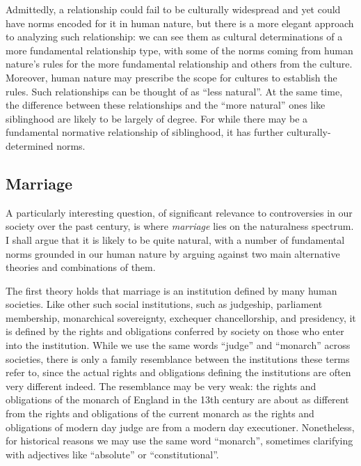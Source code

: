 Admittedly, a relationship could fail to be culturally widespread and yet could have norms encoded for it in human nature, but there is a more elegant approach to 
analyzing such relationship: we can see them as cultural determinations of a more fundamental relationship type, with some of the norms coming from human nature's
rules for the more fundamental relationship and others from the culture. Moreover, human nature may prescribe the scope for cultures to establish the rules.
Such relationships can be thought of as ``less natural''. At the same time, the difference between these relationships and the ``more natural'' ones like siblinghood
are likely to be largely of degree. For while there may be a fundamental normative relationship of siblinghood, it has further culturally-determined
norms.

\subsection{Marriage}
A particularly interesting question, of significant relevance to controversies in our society over the past century, is where \textit{marriage}
lies on the naturalness spectrum. I shall argue that it is likely to be quite natural, with a number of fundamental norms grounded in our human
nature by arguing against two main alternative theories and combinations of them.

The first theory holds that marriage is an institution defined by many human societies. Like other such social institutions, such as judgeship, parliament membership, 
monarchical sovereignty, exchequer chancellorship, and presidency, it is defined by the rights and obligations conferred by society on those who enter into the institution. 
While we use the same words ``judge'' and ``monarch'' across societies, there is only a family resemblance between the institutions these terms refer to, since the actual
rights and obligations defining the institutions are often very different indeed. The resemblance may be very weak: the rights and obligations of the monarch of England
in the 13th century are about as different from the rights and obligations of the current monarch as the rights and obligations of modern day judge are from a modern day
executioner. Nonetheless, for historical reasons we may use the same word ``monarch'', sometimes clarifying with adjectives like ``absolute'' or ``constitutional''.

